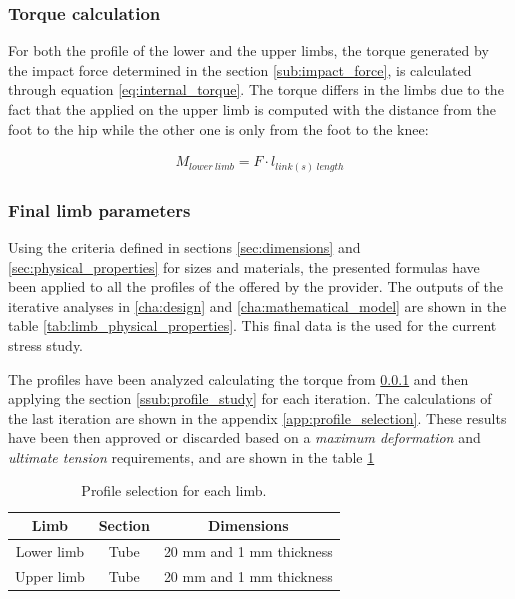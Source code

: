 \subsubsection{Torque calculation} %
\label{ssub:torque_calculation}
  For both the profile of the lower and the upper limbs, the torque generated by the impact force determined in the section \ref{sub:impact_force}, is calculated through equation \ref{eq:internal_torque}.
  The torque differs in the limbs due to the fact that the applied on the upper limb is computed with the distance from the foot to the hip while the other one is only from the foot to the knee:
  
  \begin{equation}
  \begin{aligned}
  \label{eq:internal_torque}
     M_{lower\ limb} = F \cdot l_{link(s)\ length}
  \end{aligned}
  \end{equation}

\subsubsection{Final limb parameters} %
\label{ssub:final_limb_parameters}
Using the criteria defined in sections \ref{sec:dimensions} and \ref{sec:physical_properties} for sizes and materials, the presented formulas have been applied to all the profiles of the offered by the provider.
The outputs of the iterative analyses in \ref{cha:design} and \ref{cha:mathematical_model} are shown in the table \ref{tab:limb_physical_properties}. 
This final data is the used for the current stress study.

The profiles have been analyzed calculating the torque from \ref{ssub:torque_calculation} and then applying the section \ref{ssub:profile_study} for each iteration.
The calculations of the last iteration are shown in the appendix \ref{app:profile_selection}.
These results have been then approved or discarded based on a \textit{maximum deformation} and \textit{ultimate tension} requirements, and are shown in the table \ref{tab:profile_selection}

\begin{table}[ht!]
\centering
\caption{Profile selection for each limb.}
\label{tab:profile_selection}
\begin{tabular}{c|c|c}
  \textbf{Limb} & \textbf{Section} & \textbf{Dimensions} \\ \hline
  Lower limb & Tube & 20 mm and 1 mm thickness \\ \hline
  Upper limb & Tube & 20 mm and 1 mm thickness 
\end{tabular}
\end{table}




